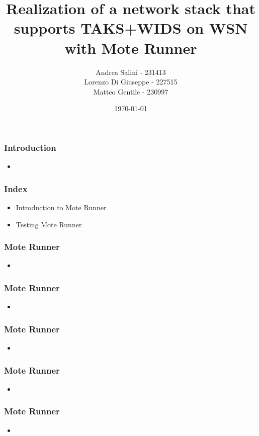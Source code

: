 \documentclass[12pt, compress]{beamer}
\title{Realization of a network stack that supports TAKS+WIDS on WSN with Mote Runner}
\subtitle{}
\date{\today}
\author{Andrea Salini - 231413\\Lorenzo Di Giuseppe - 227515\\Matteo Gentile - 230997}
\institute{DISIM - Università degli Studi dell’Aquila}
\begin{document}
  \maketitle
  
\begin{frame}[fragile]
  \frametitle{Introduction}
  \begin{itemize}
    \item 
  \end{itemize}
\end{frame}

\begin{frame}[fragile]
  \frametitle{Index}
  \begin{itemize}
    \item Introduction to Mote Runner
    \item Testing Mote Runner
  \end{itemize}
\end{frame}




\begin{frame}[fragile]
  \frametitle{Mote Runner}
  \begin{itemize}
  	\item 
  \end{itemize}
\end{frame}

\begin{frame}[fragile]
  \frametitle{Mote Runner}
  \begin{itemize}
  	\item 
  \end{itemize}
\end{frame}

\begin{frame}[fragile]
  \frametitle{Mote Runner}
  \begin{itemize}
  	\item 
  \end{itemize}
\end{frame}

\begin{frame}[fragile]
  \frametitle{Mote Runner}
  \begin{itemize}
  	\item 
  \end{itemize}
\end{frame}

\begin{frame}[fragile]
  \frametitle{Mote Runner}
  \begin{itemize}
  	\item 
  \end{itemize}
\end{frame}
\end{document}
